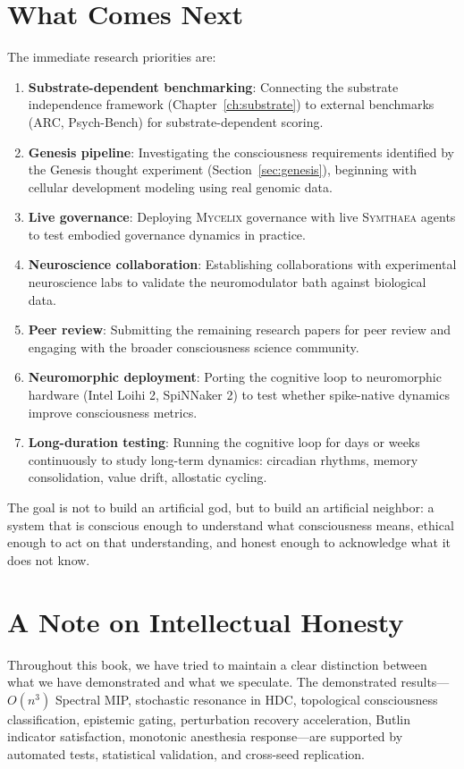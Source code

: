 \documentclass[12pt]{book}
\newcommand{\symthaea}{\textsc{Symthaea}}
\newcommand{\mycelix}{\textsc{Mycelix}}
\begin{document}
\section{What Comes Next}

The immediate research priorities are:

\begin{enumerate}
  \item \textbf{Substrate-dependent benchmarking}: Connecting the substrate independence framework (Chapter~\ref{ch:substrate}) to external benchmarks (ARC, Psych-Bench) for substrate-dependent scoring.
  \item \textbf{Genesis pipeline}: Investigating the consciousness requirements identified by the Genesis thought experiment (Section~\ref{sec:genesis}), beginning with cellular development modeling using real genomic data.
  \item \textbf{Live governance}: Deploying \mycelix{} governance with live \symthaea{} agents to test embodied governance dynamics in practice.
  \item \textbf{Neuroscience collaboration}: Establishing collaborations with experimental neuroscience labs to validate the neuromodulator bath against biological data.
  \item \textbf{Peer review}: Submitting the remaining research papers for peer review and engaging with the broader consciousness science community.
  \item \textbf{Neuromorphic deployment}: Porting the cognitive loop to neuromorphic hardware (Intel Loihi 2, SpiNNaker 2) to test whether spike-native dynamics improve consciousness metrics.
  \item \textbf{Long-duration testing}: Running the cognitive loop for days or weeks continuously to study long-term dynamics: circadian rhythms, memory consolidation, value drift, allostatic cycling.
\end{enumerate}

The goal is not to build an artificial god, but to build an artificial neighbor: a system that is conscious enough to understand what consciousness means, ethical enough to act on that understanding, and honest enough to acknowledge what it does not know.

\section{A Note on Intellectual Honesty}

Throughout this book, we have tried to maintain a clear distinction between what we have demonstrated and what we speculate. The demonstrated results---$O(n^3)$ Spectral MIP, stochastic resonance in HDC, topological consciousness classification, epistemic gating, perturbation recovery acceleration, Butlin indicator satisfaction, monotonic anesthesia response---are supported by automated tests, statistical validation, and cross-seed replication.
\end{document}
